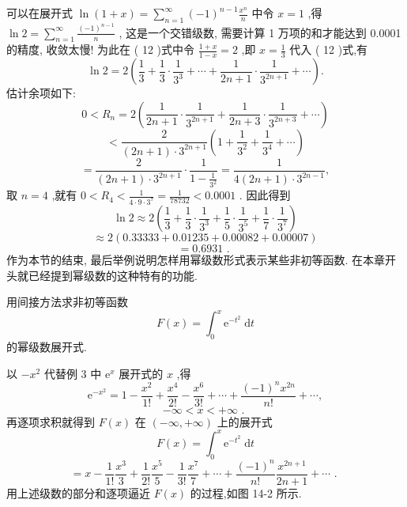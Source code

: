 \begin{solution}

\end{solution}
可以在展开式 \(\ln \left( {1 + x}\right)  = \mathop{\sum }\limits_{{n = 1}}^{\infty }{\left( -1\right) }^{n - 1}\frac{{x}^{n}}{n}\) 中令 \(x = 1\) ,得 \(\ln 2 = \mathop{\sum }\limits_{{n = 1}}^{\infty }\frac{{\left( -1\right) }^{n - 1}}{n}\) , 这是一个交错级数, 需要计算 1 万项的和才能达到 0.0001 的精度, 收敛太慢! 为此在 ( 12 )式中令 \(\frac{1 + x}{1 - x} = 2\) ,即 \(x = \frac{1}{3}\) 代入 ( 12 )式,有
\[
\ln 2 = 2\left( {\frac{1}{3} + \frac{1}{3} \cdot  \frac{1}{{3}^{3}} + \cdots  + \frac{1}{{2n} + 1} \cdot  \frac{1}{{3}^{{2n} + 1}} + \cdots }\right) .
\]
估计余项如下:
\[
0 < {R}_{n} = 2\left( {\frac{1}{{2n} + 1} \cdot  \frac{1}{{3}^{{2n} + 1}} + \frac{1}{{2n} + 3} \cdot  \frac{1}{{3}^{{2n} + 3}} + \cdots }\right)
\]
\[
< \frac{2}{\left( {{2n} + 1}\right)  \cdot  {3}^{{2n} + 1}}\left( {1 + \frac{1}{{3}^{2}} + \frac{1}{{3}^{4}} + \cdots }\right)
\]
\[
= \frac{2}{\left( {{2n} + 1}\right)  \cdot  {3}^{{2n} + 1}} \cdot  \frac{1}{1 - \frac{1}{{3}^{2}}} = \frac{1}{4\left( {{2n} + 1}\right)  \cdot  {3}^{{2n} - 1}},
\]
取 \(n = 4\) ,就有 \(0 < {R}_{4} < \frac{1}{4 \cdot  9 \cdot  {3}^{7}} = \frac{1}{78732} < {0.0001}\) . 因此得到
\[
\ln 2 \approx  2\left( {\frac{1}{3} + \frac{1}{3} \cdot  \frac{1}{{3}^{3}} + \frac{1}{5} \cdot  \frac{1}{{3}^{5}} + \frac{1}{7} \cdot  \frac{1}{{3}^{7}}}\right)
\]
\[
\approx  2\left( {{0.33333} + {0.01235} + {0.00082} + {0.00007}}\right)
\]
\[
= {0.6931}\text{ . }
\]
作为本节的结束, 最后举例说明怎样用幂级数形式表示某些非初等函数. 在本章开头就已经提到幂级数的这种特有的功能.

\begin{example}

\end{example}
用间接方法求非初等函数
\[
F\left( x\right)  = {\int }_{0}^{x}{\mathrm{e}}^{-{t}^{2}}\mathrm{\;d}t
\]
的幂级数展开式.

\begin{solution}

\end{solution}
以 \(- {x}^{2}\) 代替例 3 中 \({\mathrm{e}}^{x}\) 展开式的 \(x\) ,得
\[
{\mathrm{e}}^{-{x}^{2}} = 1 - \frac{{x}^{2}}{1!} + \frac{{x}^{4}}{2!} - \frac{{x}^{6}}{3!} + \cdots  + \frac{{\left( -1\right) }^{n}{x}^{2n}}{n!} + \cdots ,
\]
\[
- \infty  < x <  + \infty \text{ . }
\]
再逐项求积就得到 \(F\left( x\right)\) 在 \(\left( {-\infty , + \infty }\right)\) 上的展开式
\[
F\left( x\right)  = {\int }_{0}^{x}{\mathrm{e}}^{-{t}^{2}}\mathrm{\;d}t
\]
\[
= x - \frac{1}{1!}\frac{{x}^{3}}{3} + \frac{1}{2!}\frac{{x}^{5}}{5} - \frac{1}{3!}\frac{{x}^{7}}{7} + \cdots  + \frac{{\left( -1\right) }^{n}}{n!}\frac{{x}^{{2n} + 1}}{{2n} + 1} + \cdots \text{ . }
\]
用上述级数的部分和逐项逼近 \(F\left( x\right)\) 的过程,如图 14-2 所示.

